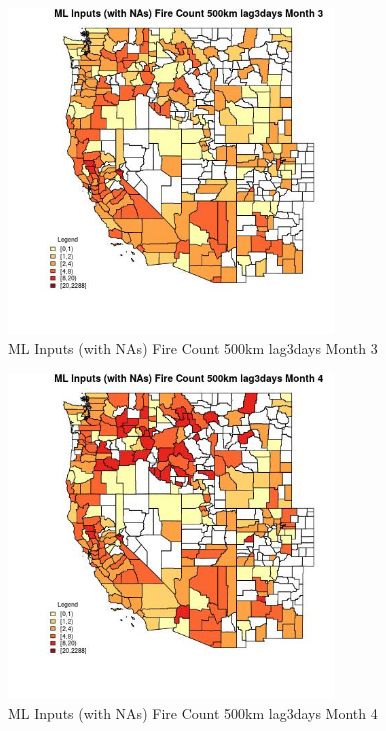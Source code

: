 \begin{figure} 
\centering  
\includegraphics[width=0.77\textwidth]{Code_Outputs/Report_ML_input_PM25_Step4_part_e_de_duplicated_aves_compiled_2019-05-20wNAs_CountyFire_Count_500km_lag3daysmedianMonth3.jpg} 
\caption{\label{fig:Report_ML_input_PM25_Step4_part_e_de_duplicated_aves_compiled_2019-05-20wNAsCountyFire_Count_500km_lag3daysmedianMonth3}ML Inputs (with NAs) Fire Count 500km lag3days Month 3} 
\end{figure} 
 

\begin{figure} 
\centering  
\includegraphics[width=0.77\textwidth]{Code_Outputs/Report_ML_input_PM25_Step4_part_e_de_duplicated_aves_compiled_2019-05-20wNAs_CountyFire_Count_500km_lag3daysmedianMonth4.jpg} 
\caption{\label{fig:Report_ML_input_PM25_Step4_part_e_de_duplicated_aves_compiled_2019-05-20wNAsCountyFire_Count_500km_lag3daysmedianMonth4}ML Inputs (with NAs) Fire Count 500km lag3days Month 4} 
\end{figure} 
 

